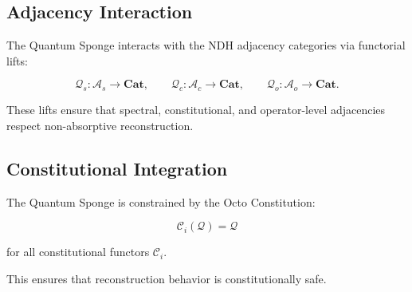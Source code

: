
\subsection{Adjacency Interaction}

The Quantum Sponge interacts with the NDH adjacency categories via
functorial lifts:

\[
\mathcal{Q}_s : \mathcal{A}_s \to \mathbf{Cat}, \qquad
\mathcal{Q}_c : \mathcal{A}_c \to \mathbf{Cat}, \qquad
\mathcal{Q}_o : \mathcal{A}_o \to \mathbf{Cat}.
\]

These lifts ensure that spectral, constitutional, and operator-level
adjacencies respect non-absorptive reconstruction.


\subsection{Constitutional Integration}

The Quantum Sponge is constrained by the Octo Constitution:

\[
\mathcal{C}_i(\mathcal{Q}) = \mathcal{Q}
\]

for all constitutional functors $\mathcal{C}_i$.

This ensures that reconstruction behavior is constitutionally safe.


